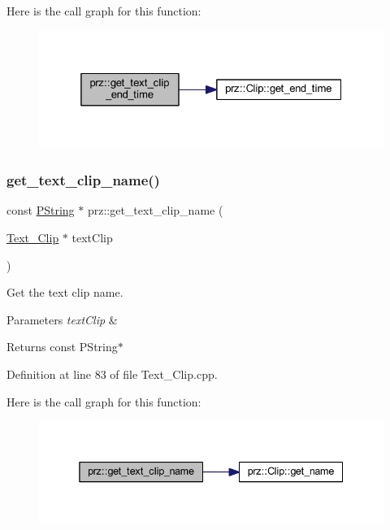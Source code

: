 Here is the call graph for this function\+:
\nopagebreak
\begin{figure}[H]
\begin{center}
\leavevmode
\includegraphics[width=325pt]{namespaceprz_a6c9111d61f5d8a4089c0dce9b8503f28_cgraph}
\end{center}
\end{figure}
\mbox{\label{namespaceprz_a87875ccb3d758a8061f6e9985fcb6780}} 
\subsubsection{\texorpdfstring{get\_text\_clip\_name()}{get\_text\_clip\_name()}}
{\footnotesize\ttfamily const \mbox{\hyperlink{classprz_1_1_p_string}{P\+String}} $\ast$ prz\+::get\+\_\+text\+\_\+clip\+\_\+name (\begin{DoxyParamCaption}\item[{\mbox{\hyperlink{classprz_1_1_text___clip}{Text\+\_\+\+Clip}} $\ast$}]{text\+Clip }\end{DoxyParamCaption})}



Get the text clip name. 


\begin{DoxyParams}{Parameters}
{\em text\+Clip} & \\
\hline
\end{DoxyParams}
\begin{DoxyReturn}{Returns}
const P\+String$\ast$ 
\end{DoxyReturn}


Definition at line 83 of file Text\+\_\+\+Clip.\+cpp.

Here is the call graph for this function\+:
\nopagebreak
\begin{figure}[H]
\begin{center}
\leavevmode
\includegraphics[width=338pt]{namespaceprz_a87875ccb3d758a8061f6e9985fcb6780_cgraph}
\end{center}
\end{figure}
\mbox{\label{namespaceprz_a616eb57f615a3c7b942e33139a30b25a}} 
